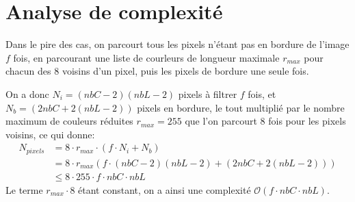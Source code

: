 \documentclass[a4paper, 11pt]{article}
\begin{document}
\section*{Analyse de complexité}
\begin{minipage}{0.5\linewidth}
Dans le pire des cas, on parcourt tous les pixels n'étant pas en bordure de l'image $f$ fois, en parcourant une liste de courleurs de longueur maximale $r_{max}$ pour chacun des 8 voisins d'un pixel, puis les pixels de bordure une seule fois.

On a donc $N_i = (nbC - 2)(nbL-2)$ pixels à filtrer $f$ fois, et $N_b = (2nbC + 2(nbL-2))$ pixels en bordure, le tout multiplié par le nombre maximum de couleurs réduites $r_{max} = 255$ que l'on parcourt 8 fois pour les pixels voisins, ce qui donne:
\begin{align}
N_{pixels} &= 8 \cdot r_{max} \cdot (f \cdot N_i + N_b ) \nonumber \\
&= 8 \cdot r_{max}  (f \cdot (nbC - 2)(nbL-2) + (2nbC + 2(nbL-2))) \nonumber \\
&\leq 8\cdot 255\cdot f\cdot nbC\cdot nbL \nonumber
\end{align}
Le terme $r_{max}\cdot 8$ étant constant, on a ainsi une complexité $\mathcal{O}(f\cdot nbC\cdot nbL)$.
\end{minipage}\hfil
\end{document}
